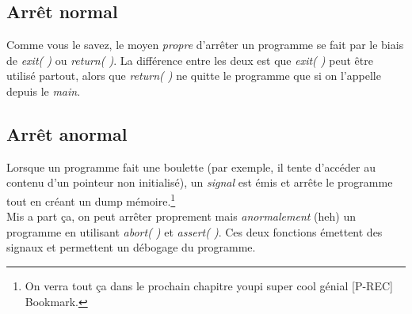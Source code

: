 \documentclass{report}
\begin{document}
\subsection{Arrêt normal}
Comme vous le savez, le moyen \emph{propre} d'arrêter un programme se fait par le biais de \emph{exit( )} ou \emph{return( )}. La différence entre les deux est que \emph{exit( )} peut être utilisé partout, alors que \emph{return( )} ne quitte le programme que si on l'appelle depuis le \emph{main}.
\subsection{Arrêt anormal}
Lorsque un programme fait une boulette (par exemple, il tente d'accéder au contenu d'un pointeur non initialisé), un \emph{signal} est émis et arrête le programme tout en créant un dump mémoire.\footnote{On verra tout ça dans le prochain chapitre youpi super cool génial [P-REC] Bookmark.} \\
Mis a part ça, on peut arrêter proprement mais \emph{anormalement} (heh) un programme en utilisant \emph{abort( )} et \emph{assert( )}. Ces deux fonctions émettent des signaux et permettent un débogage du programme.
\end{document}
